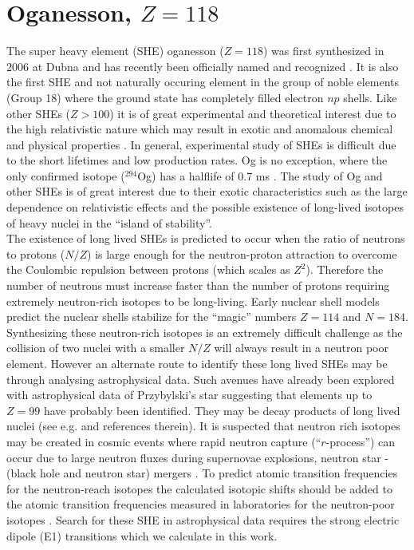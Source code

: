 \documentclass[8pt,a4paper, twoside]{report}
\begin{document}
\chapter{Oganesson, $Z=118$}
The super heavy element (SHE) oganesson ($Z=118$) was first synthesized in 2006 at Dubna \cite{OganessianOg2006} and has recently been officially named and recognized \cite{Karol2016}.  It is also the first SHE and not naturally occuring element in the group of noble elements (Group 18) where the ground state has completely filled electron $np$ shells. Like other SHEs  ($Z>100$) it is of great experimental and theoretical interest due to the high relativistic nature  which may result in exotic and anomalous chemical and physical properties \cite{Pershina2009, Schwerdtfeger2014}. In general, experimental study of SHEs is difficult  due to the short lifetimes and low production rates. Og is no exception, where the only confirmed isotope ($^{294}$Og) has a halflife of 0.7 ms \cite{OganessianOg2006}. The study of Og and other SHEs is of great interest due to their exotic characteristics such as the large dependence on relativistic effects and the possible existence of long-lived isotopes of heavy nuclei in the ``island of stability''. \\
\linebreak
The existence of long lived SHEs is predicted to occur when the ratio of neutrons to protons ($N/Z$) is large enough for the neutron-proton attraction to overcome  the Coulombic repulsion between protons (which scales as $Z^2$). Therefore the number of neutrons must increase faster than the number of protons requiring extremely neutron-rich isotopes to be  long-living\cite{OUL2004, HHO2013}.  Early nuclear shell models predict the nuclear shells stabilize for the ``magic'' numbers $Z=114$ and $N=184$\cite{OUL2004, HHO2013}. Synthesizing these neutron-rich isotopes is an extremely difficult challenge as the collision of two nuclei with a smaller $N/Z$ will always result in a neutron poor element.  However an alternate route to identify these long lived SHEs may be through analysing astrophysical data. Such avenues have already been explored with astrophysical data of  Przybylski's star suggesting that elements up to $Z=99$ have probably  been identified\cite{Polukhina2012, Gopka2008, Fivet2007}.  They may be decay products of long lived nuclei (see e.g.   \cite{DFW17} and references therein).  It is suspected that neutron rich isotopes may be created in cosmic events where rapid neutron capture (``$r$-process'') can occur due to large neutron fluxes during supernovae explosions, neutron star - (black hole and neutron star) mergers \cite{Goriely2011, Fuller2017, Friebel2018, Schuetrumpf2015}. To predict  atomic transition frequencies  for the neutron-reach isotopes the  calculated isotopic shifts should be added to the atomic transition frequencies measured in laboratories for the neutron-poor isotopes \cite{DFW17}. Search for these SHE in astrophysical data requires the strong electric dipole (E1) transitions which we calculate in this work.
\end{document}
